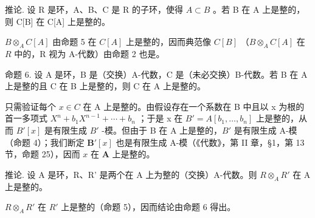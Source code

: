 推论. 设 R 是环，A、B、C 是 R 的子环，使得 \(A \subset B\) 。若 B 在 A 上是整的，则 C{[}B{]} 在 C{[}A{]} 上是整的。

\(B \otimes_{A} C[A]\) 由命题 5 在 \(C[A]\) 上是整的，因而典范像 \(C[B]\) （\(B \otimes_{A} C[A]\) 在 \(R\) 中的，R 视为 A-代数）由命题 2 也是。

命题 6. 设 A 是环，B 是（交换）A-代数，C 是（未必交换）B-代数。若 B 在 A 上是整的且 C 在 B 上是整的，则 C 在 A 上是整的。

只需验证每个 \(x \in C\) 在 A 上是整的。由假设存在一个系数在 B 中且以 x 为根的首一多项式 \(X^{n} + b_{1}X^{n-1} + \cdots + b_{n}\) ；于是 x 在 \(B' = A[b_{1}, \ldots, b_{n}]\) 上是整的，从而 \(B'[x]\) 是有限生成 \(B'\) -模。但由于 B 在 A 上是整的，\(B'\) 是有限生成 A-模（命题 4）；我们断定 \(\mathbf{B}'[x]\) 也是有限生成 A-模（《代数》，第 II 章，§1，第 13 节，命题 25），因而 \(x\) 在 \(\mathbf{A}\) 上是整的。

推论. 设 A 是环，R、R' 是两个在 A 上为整的（交换）A-代数。则 \(R \otimes_{A} R'\) 在 A 上是整的。

\(R \otimes_{A} R'\) 在 \(R'\) 上是整的（命题 5），因而结论由命题 6 得出。

